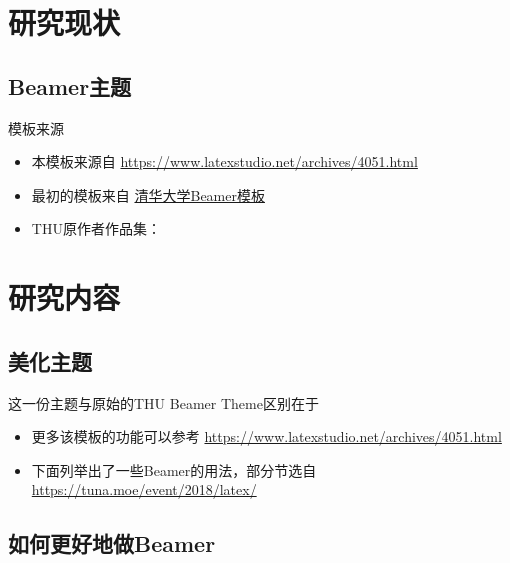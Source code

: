 \documentclass{beamer}  %
\begin{document}
\section{研究现状}

\subsection{Beamer主题}

\begin{frame}{模板来源}
    \begin{itemize}
        \item 本模板来源自 \newline \url{https://www.latexstudio.net/archives/4051.html}
        \item 最初的模板来自 \href{http://far.tooold.cn/post/latex/beamertsinghua}{清华大学Beamer模板}
        \item THU原作者作品集：\href{https://github.com/Trinkle23897/oi_slides}{\color{purple}{GitHub 仓库}}
    \end{itemize}
\end{frame}


\section{研究内容}

\subsection{美化主题}

\begin{frame}{这一份主题与原始的THU Beamer Theme区别在于}
    \begin{itemize}
        \item 更多该模板的功能可以参考 \url{https://www.latexstudio.net/archives/4051.html}
        \item 下面列举出了一些Beamer的用法，部分节选自 \url{https://tuna.moe/event/2018/latex/}
    \end{itemize}
\end{frame}

\subsection{如何更好地做Beamer}
\end{document}
